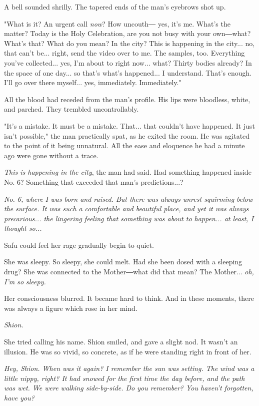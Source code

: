 A bell sounded shrilly. The tapered ends of the man's eyebrows shot up.

"What is it? An urgent call \emph{now}? How uncouth― yes, it's me. What's the
matter? Today is the Holy Celebration, are you not busy with your
own―what? What's that? What do you mean? In the city? This is happening
in the city... no, that can't be... right, send the video over to me.
The samples, too. Everything you've collected... yes, I'm about to right
now... what? Thirty bodies already? In the space of one day... so that's
what's happened... I understand. That's enough. I'll go over there
myself... yes, immediately. Immediately."

All the blood had receded from the man's profile. His lips were
bloodless, white, and parched. They trembled uncontrollably.

"It's a mistake. It must be a mistake. That... that couldn't have
happened. It just isn't possible," the man practically spat, as he
exited the room. He was agitated to the point of it being unnatural. All
the ease and eloquence he had a minute ago were gone without a trace.

\emph{This is happening in the city}, the man had said. Had something happened
inside No. 6? Something that exceeded that man's predictions...?

\emph{No. 6, where I was born and raised. But there was always unrest
	squirming below the surface. It was such a comfortable and beautiful
	place, and yet it was always precarious... the lingering feeling that
	something was about to happen... at least, I thought so...}

Safu could feel her rage gradually begin to quiet.

She was sleepy. So sleepy, she could melt. Had she been dosed with a
sleeping drug? She was connected to the Mother―what did that mean? The
Mother... \emph{oh, I'm so sleepy.}

Her consciousness blurred. It became hard to think. And in these
moments, there was always a figure which rose in her mind.

\emph{Shion.}

She tried calling his name. Shion smiled, and gave a slight nod. It
wasn't an illusion. He was so vivid, so concrete, as if he were standing
right in front of her.

\emph{Hey, Shion. When was it again? I remember the sun was setting. The wind
	was a little nippy, right? It had snowed for the first time the day
	before, and the path was wet. We were walking side-by-side. Do you
	remember? You haven't forgotten, have you?}

